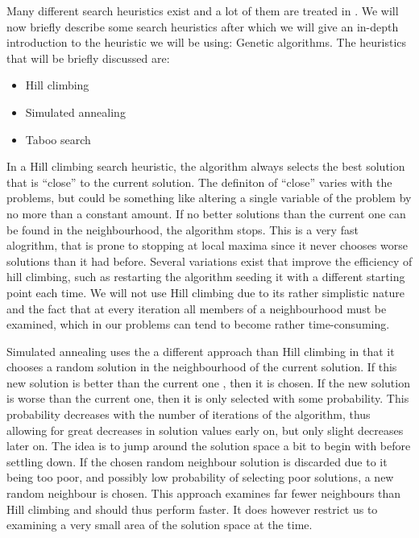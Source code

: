 Many different search heuristics exist and a lot of them are treated
in \cite{russel}. We will now briefly describe some search heuristics
after which we will give an in-depth introduction to the heuristic we
will be using: Genetic algorithms. The heuristics that will be briefly
discussed are:
\begin{itemize}
\item Hill climbing
\item Simulated annealing
\item Taboo search
\end{itemize}


In a Hill climbing search heuristic, the algorithm always selects the
best solution that is ``close'' to the current solution. The definiton
of ``close'' varies with the problems, but could be something like
altering a single variable of the problem by no more than a constant
amount. If no better solutions than the current one can be found in
the neighbourhood, the algorithm stops. This is a very fast alogrithm,
that is prone to stopping at local maxima since it never chooses worse
solutions than it had before. Several variations exist that improve
the efficiency of hill climbing, such as restarting the algorithm
seeding it with a different starting point each time. We will not use
Hill climbing due to its rather simplistic nature and the fact that at every
iteration all members of a neighbourhood must be examined, which in
our problems can tend to become rather time-consuming.


Simulated annealing uses the a different approach than Hill climbing
in that it chooses a random solution in the neighbourhood of the
current solution. If this new solution is better than the current one
, then it is chosen. If the new solution is worse than the current
one, then it is only selected with some probability. This probability
decreases with the number of iterations of the algorithm, thus
allowing for great decreases in solution values early on, but only
slight decreases later on.  The idea is to jump around the solution
space a bit to begin with before settling down. If the chosen random
neighbour solution is discarded due to it being too poor, and possibly
low probability of selecting poor solutions, a new random neighbour is
chosen. This approach examines far fewer neighbours than Hill climbing
and should thus perform faster. It does however restrict us to
examining a very small area of the solution space at the time.

